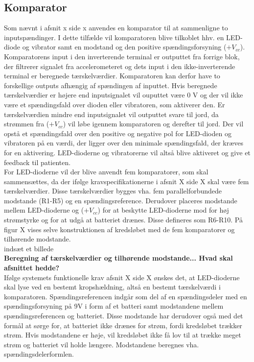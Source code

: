 \subsection{Komparator}
Som nævnt i afsnit x side x anvendes en komparator til at sammenligne to inputspændinger. %
I dette tilfælde vil komparatoren blive tilkoblet hhv. en LED-diode og vibrator samt en modstand og den positive spændingsforsyning ($+V_{cc}$). Komparatorens input i den inverterende terminal er outputtet fra forrige blok, der filtrerer signalet fra accelerometeret og dets input i den ikke-inverterende terminal er beregnede tærskelværdier. Komparatoren kan derfor have to forskellige outputs afhængig af spændingen af inputtet. Hvis beregnede tærskelværdier er højere end inputsignalet vil ouputtet være 0 V og der vil ikke være et spændingsfald over dioden eller vibratoren, som aktiverer den. Er tærskelværdien mindre end inputsignalet vil outputtet svare til jord, da strømmen fra ($+V_{cc}$) vil løbe igennem komparatoren og derefter til jord. Der vil opstå et spændingsfald over den positive og negative pol for LED-dioden og vibratoren på en værdi, der ligger over den minimale spændingsfald, der kræves for en aktivering. LED-dioderne og vibratorerne vil altså blive aktiveret og give et feedback til patienten. \\
For LED-dioderne vil der blive anvendt fem komparatorer, som skal sammensættes, da der ifølge kravspecifikationerne i afsnit X side X skal være fem tærskelværdier. Disse tærskelværdier bygges vha. fem parallelforbundede modstande (R1-R5) og en spændingsreference. Derudover placeres modstande mellem LED-dioderne og ($+V_{cc}$) for at beskytte LED-dioderne mod for høj strømstyrke og for at udgå at batteriet drænes. Disse defineres som R6-R10. På figur X vises selve konstruktionen af kredsløbet med de fem komparatorer og tilhørende modstande. \\

indsæt et billede \\

\textbf{Beregning af tærskelværdier og tilhørende modstande... Hvad skal afsnittet hedde?} \\
Ifølge systemets funktionelle krav afsnit X side X ønskes det, at LED-dioderne skal lyse ved en bestemt kropshældning, altså en bestemt tærskelværdi i komparatoren. Spændingsreferencen indgår som del af en spændingsdeler med en spændingsforsyning på 9V i form af et batteri samt modstandene mellem spændingsreferencen og batteriet. Disse modstande har derudover også med det formål at sørge for, at batteriet ikke drænes for strøm, fordi kredsløbet trækker strøm. Hvis modstandene er høje, vil kredsløbet ikke få lov til at trække meget strøm og batteriet vil holde længere. Modstandene beregnes vha. spændingsdelerformlen. \\

